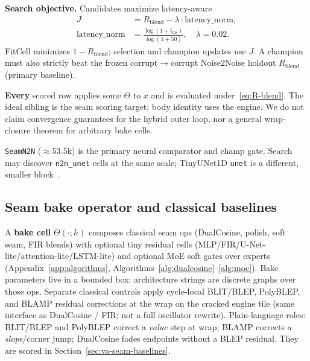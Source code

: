 \textbf{Search objective.}
Candidates maximize latency-aware
\begin{equation}
\label{eq:outer-obj}
\begin{aligned}
J&=R_{\mathrm{blend}}-\lambda\cdot\mathrm{latency\_norm},\\
\mathrm{latency\_norm}
&=\frac{\log(1+t_{\mathrm{ms}})}{\log(1+50)},
\quad \lambda=0.02.
\end{aligned}
\end{equation}
FitCell minimizes $1-R_{\mathrm{blend}}$; selection and champion updates use $J$.
A champion must also strictly beat the frozen corrupt$\to$corrupt Noise2Noise holdout $R_{\mathrm{blend}}$ (primary baseline).

\textbf{Every} scored row applies some $\Theta$ to $x$ and is evaluated under~\eqref{eq:R-blend}.
The ideal sibling is the seam scoring target; body identity uses the engine.
We do not claim convergence guarantees for the hybrid outer loop, nor a general wrap-closure theorem for arbitrary bake cells.

\begin{remark}
\label{rem:n2n}
\texttt{SeamN2N} (${\approx}53.5$k) is the primary neural comparator and champ gate.
Search may discover \texttt{n2n\_unet} cells at the same scale; TinyUNet1D \texttt{unet} is a different, smaller block~\cite{lehtinen2018,kashyap2021n2n}.
\end{remark}

\subsection{Seam bake operator and classical baselines}
\label{sec:bake}

A \textbf{bake cell} $\Theta(\cdot;h)$ composes classical seam ops (DualCosine, polish, soft seam, FIR blends) with optional tiny residual cells (MLP/FIR/U-Net-lite/attention-lite/LSTM-lite) and optional MoE soft gates over experts (Appendix~\ref{app:algorithms}, Algorithms~\ref{alg:dualcosine}--\ref{alg:moe}).
Bake parameters live in a bounded box; architecture strings are discrete graphs over those ops.
Separate classical controls apply cycle-local BLIT/BLEP, PolyBLEP, and BLAMP residual corrections at the wrap on the cracked engine tile (same interface as DualCosine / FIR; not a full oscillator rewrite).
Plain-language roles: BLIT/BLEP and PolyBLEP correct a \emph{value} step at wrap; BLAMP corrects a \emph{slope}/corner jump; DualCosine fades endpoints without a BLEP residual.
They are scored in Section~\ref{sec:va-seam-baselines}.

